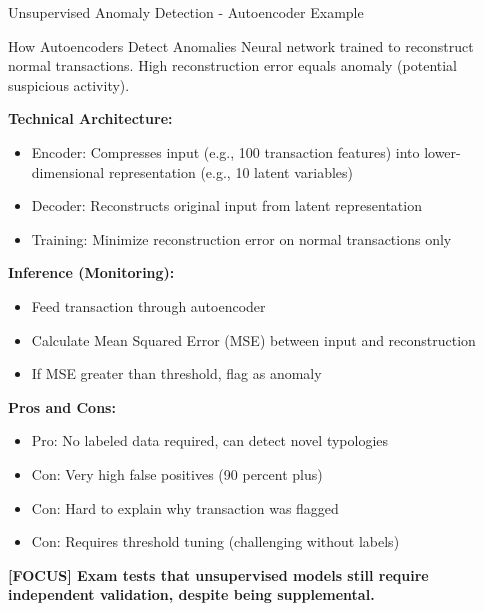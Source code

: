 \documentclass[11pt,a4paper]{beamer}
\newcommand{\examfocus}[1]{\textcolor{orange!80!black}{\textbf{[FOCUS] #1}}}
\begin{document}
	\begin{frame}{Unsupervised Anomaly Detection - Autoencoder Example}
		\begin{block}{How Autoencoders Detect Anomalies}
			Neural network trained to reconstruct normal transactions. High reconstruction error equals anomaly (potential suspicious activity).
		\end{block}
		
		\textbf{Technical Architecture:}
		\begin{itemize}
			\item Encoder: Compresses input (e.g., 100 transaction features) into lower-dimensional representation (e.g., 10 latent variables)
			\item Decoder: Reconstructs original input from latent representation
			\item Training: Minimize reconstruction error on normal transactions only
		\end{itemize}
		
		\textbf{Inference (Monitoring):}
		\begin{itemize}
			\item Feed transaction through autoencoder
			\item Calculate Mean Squared Error (MSE) between input and reconstruction
			\item If MSE greater than threshold, flag as anomaly
		\end{itemize}
		
		\textbf{Pros and Cons:}
		\begin{itemize}
			\item Pro: No labeled data required, can detect novel typologies
			\item Con: Very high false positives (90 percent plus)
			\item Con: Hard to explain why transaction was flagged
			\item Con: Requires threshold tuning (challenging without labels)
		\end{itemize}
		
		\examfocus{Exam tests that unsupervised models still require independent validation, despite being supplemental.}
	\end{frame}
	
\end{document}

